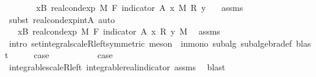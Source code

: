 \begin{isabellebody}
\ \ \isamarkupfalse%
\ \isamarkupfalse%
\ {\isachardoublequoteopen}{\isachardot}{\kern0pt}{\isachardot}{\kern0pt}{\isachardot}{\kern0pt}\ {\isacharequal}{\kern0pt}\ {\isacharparenleft}{\kern0pt}{\isasymintegral}x{\isasymin}B{\isachardot}{\kern0pt}\ real{\isacharunderscore}{\kern0pt}cond{\isacharunderscore}{\kern0pt}exp\ M\ F\ {\isacharparenleft}{\kern0pt}indicator\ A{\isacharparenright}{\kern0pt}\ x\ {\isasympartial}M{\isacharparenright}{\kern0pt}\ {\isacharasterisk}{\kern0pt}\isactrlsub R\ y{\isachardoublequoteclose}\ \isamarkupfalse%
\ {}\ assms\ \isamarkupfalse%
\ {\isacharparenleft}{\kern0pt}subst\ real{\isacharunderscore}{\kern0pt}cond{\isacharunderscore}{\kern0pt}exp{\isacharunderscore}{\kern0pt}intA{\isacharcomma}{\kern0pt}\ auto{\isacharparenright}{\kern0pt}\isanewline
\ \ \isamarkupfalse%
\ \isamarkupfalse%
\ {\isachardoublequoteopen}{\isachardot}{\kern0pt}{\isachardot}{\kern0pt}{\isachardot}{\kern0pt}\ {\isacharequal}{\kern0pt}\ {\isasymintegral}x{\isasymin}B{\isachardot}{\kern0pt}\ {\isacharparenleft}{\kern0pt}real{\isacharunderscore}{\kern0pt}cond{\isacharunderscore}{\kern0pt}exp\ M\ F\ {\isacharparenleft}{\kern0pt}indicator\ A{\isacharparenright}{\kern0pt}\ x\ {\isacharasterisk}{\kern0pt}\isactrlsub R\ y{\isacharparenright}{\kern0pt}\ {\isasympartial}M{\isachardoublequoteclose}\ \isamarkupfalse%
\ assms\ \isamarkupfalse%
\ {\isacharparenleft}{\kern0pt}intro\ set{\isacharunderscore}{\kern0pt}integral{\isacharunderscore}{\kern0pt}scaleR{\isacharunderscore}{\kern0pt}left{\isacharbrackleft}{\kern0pt}symmetric{\isacharbrackright}{\kern0pt}{\isacharcomma}{\kern0pt}\ meson\ {}\ in{\isacharunderscore}{\kern0pt}mono\ subalg\ subalgebra{\isacharunderscore}{\kern0pt}def{\isacharcomma}{\kern0pt}\ blast{\isacharparenright}{\kern0pt}\isanewline
\ \ \isamarkupfalse%
\ \isamarkupfalse%
\ {\isacharquery}{\kern0pt}case\ \isacommand{{\isachardot}{\kern0pt}}\isamarkupfalse%
\isanewline
{}\isamarkupfalse%
\isanewline
\ \ \isamarkupfalse%
\ {}\isanewline
\ \ \isamarkupfalse%
\ \isamarkupfalse%
\ {\isacharquery}{\kern0pt}case\ \isamarkupfalse%
\ integrable{\isacharunderscore}{\kern0pt}scaleR{\isacharunderscore}{\kern0pt}left\ integrable{\isacharunderscore}{\kern0pt}real{\isacharunderscore}{\kern0pt}indicator\ assms\ \isamarkupfalse%
\ blast\isanewline
{}\isamarkupfalse%

\end{isabellebody}
